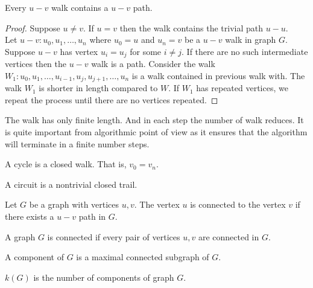 \begin{theorem}
	Every $u-v$ walk contains a $u-v$ path.
\end{theorem}
\begin{proof}
	Suppose $u \ne v$. If $u = v$ then the walk contains the trivial path $u-u$.\\

	Let $u-v : u_0,u_1,\dots,u_n$ where $u_0 = u$ and $u_n = v$ be a $u-v$ walk in graph $G$.
	Suppose $u-v$ has vertex $u_i = u_j$ for some $i \ne j$.
	If there are no such intermediate vertices then the $u-v$ walk is a path.
	Consider the walk $W_1 : u_0,u_1,\dots,u_{i-1},u_j,u_{j+1},\dots,u_n$ is a walk contained in previous walk with. The walk $W_1$ is shorter in length compared to $W$. If $W_1$ has repeated vertices, we repeat the process until there are no vertices repeated.
\end{proof}

\begin{commentary}
	The walk has only finite length. And in each step the number of walk reduces. It is quite important from algorithmic point of view as it ensures that the algorithm will terminate in a finite number steps.
\end{commentary}

\begin{definition}[cycle]
	A cycle is a closed walk. That is, $v_0 = v_n$.
\end{definition}

\begin{definition}[circuit]
	A circuit is a nontrivial closed trail.
\end{definition}

\begin{definition}
	Let $G$ be a graph with vertices $u,v$.
	The vertex $u$ is connected to the vertex $v$ if there exists a $u-v$ path in $G$.
\end{definition}

\begin{definition}
	A graph $G$ is connected if every pair of vertices $u,v$ are connected in $G$.
\end{definition}

\begin{definition}[component]
	A component of $G$ is a maximal connected subgraph of $G$.
\end{definition}

\begin{remark}
	$k(G)$ is the number of components of graph $G$.
\end{remark}
